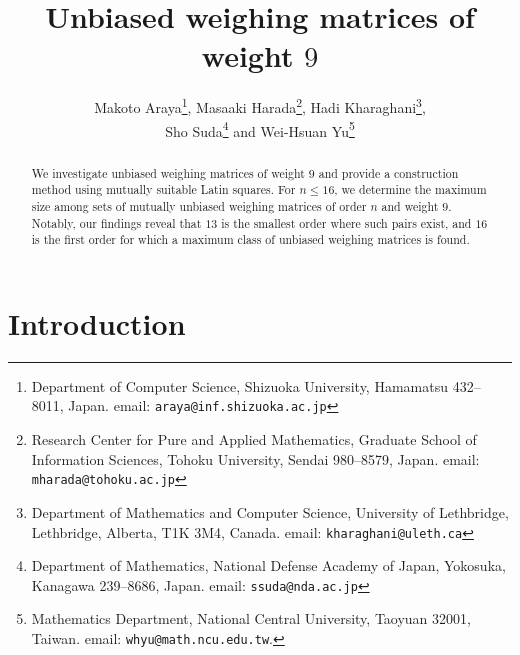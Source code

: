 \documentclass[12pt]{article}
\theoremstyle{remark}
\begin{document}
\title{Unbiased weighing matrices of weight $9$}

\author{
Makoto Araya\thanks{Department of Computer Science,
Shizuoka University,
Hamamatsu 432--8011, Japan.
email: \texttt{araya@inf.shizuoka.ac.jp}},
Masaaki Harada\thanks{
Research Center for Pure and Applied Mathematics,
Graduate School of Information Sciences,
Tohoku University, Sendai 980--8579, Japan.
email: \texttt{mharada@tohoku.ac.jp}},
Hadi Kharaghani\thanks{
Department of Mathematics and Computer Science, University of Lethbridge,
Lethbridge, Alberta, T1K 3M4, Canada.
email: \texttt{kharaghani@uleth.ca}}, 
\\
Sho Suda\thanks{
Department of Mathematics, National Defense Academy of Japan, Yokosuka, Kanagawa 239--8686,
Japan.
email: \texttt{ssuda@nda.ac.jp}}
  and 
Wei-Hsuan Yu\thanks{
Mathematics Department, National Central University, Taoyuan 32001, Taiwan. 
email: \texttt{whyu@math.ncu.edu.tw}. 
}
}


\maketitle


\begin{abstract}
We investigate unbiased weighing matrices of weight $9$ 
and provide a construction method using mutually suitable Latin squares. 
For $n \le 16$, we determine the maximum size  among sets of mutually
unbiased weighing matrices of order $n$ and weight $9$.
Notably, our findings reveal that $13$ is the
smallest order where such pairs exist, and $16$ is the first order for which
a maximum class of unbiased weighing matrices is found.
\end{abstract}


\section{Introduction}\label{Sec:1}
\end{document}
